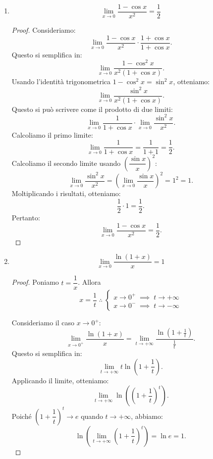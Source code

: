 \documentclass{article}
\theoremstyle{plain}
\theoremstyle{definition}
\theoremstyle{remark}
\begin{document}
\begin{enumerate}
\begin{proof}
\[        \]
        Pertanto:
        \[
        \lim_{t \to +\infty}\left(1 + \dfrac{1}{t}\right)^{(1 + t)} = e \cdot 1 = e.
        \]
    \end{proof}
    \item \[\lim_{x\to0}\dfrac{1-\cos x}{x^2}=\dfrac{1}{2}\]
    \begin{proof}
        Consideriamo:
        \[
        \lim_{x \to 0}\dfrac{1-\cos x}{x^2} \cdot \dfrac{1+\cos x}{1+\cos x}.
        \]
        Questo si semplifica in:
        \[
        \lim_{x \to 0}\dfrac{1-\cos^2 x}{x^2(1+\cos x)}.
        \]
        Usando l'identità trigonometrica \( 1 - \cos^2 x = \sin^2 x \), otteniamo:
        \[
        \lim_{x \to 0}\dfrac{\sin^2 x}{x^2(1+\cos x)}.
        \]
        Questo si può scrivere come il prodotto di due limiti:
        \[
        \lim_{x \to 0}\dfrac{1}{1+\cos x} \cdot \lim_{x \to 0}\dfrac{\sin^2 x}{x^2}.
        \]
        Calcoliamo il primo limite:
        \[
        \lim_{x \to 0}\dfrac{1}{1+\cos x} = \dfrac{1}{1+1} = \dfrac{1}{2}.
        \]
        Calcoliamo il secondo limite usando \( \left(\dfrac{\sin x}{x}\right)^2 \):
        \[
        \lim_{x \to 0}\dfrac{\sin^2 x}{x^2} = \left(\lim_{x \to 0}\dfrac{\sin x}{x}\right)^2 = 1^2 = 1.
        \]
        Moltiplicando i risultati, otteniamo:
        \[
        \dfrac{1}{2} \cdot 1 = \dfrac{1}{2}.
        \]
        Pertanto:
        \[
        \lim_{x\to0}\dfrac{1-\cos x}{x^2} = \dfrac{1}{2}.
        \]
    \end{proof}
    \item \[\lim_{x\to0}\dfrac{\ln(1+x)}{x}=1\]
    \begin{proof}
        Poniamo \( t = \dfrac{1}{x} \). Allora 
        \[x=\dfrac{1}{t}\;\therefore\;\begin{cases}x\to0^+\;\implies\; t\to+\infty\\ x\to0^-\;\implies\; t\to-\infty\end{cases}\]

        Consideriamo il caso \( x \to 0^+ \):
        \[
        \lim_{x\to0^+}\dfrac{\ln(1+x)}{x} = \lim_{t\to+\infty}\dfrac{\ln\left(1+\frac{1}{t}\right)}{\frac{1}{t}}.
        \]
        Questo si semplifica in:
        \[
        \lim_{t\to+\infty} t \ln\left(1+\dfrac{1}{t}\right).
        \]
        Applicando il limite, otteniamo:
        \[
        \lim_{t\to+\infty} \ln\left( \left(1+\dfrac{1}{t}\right)^t \right).
        \]
        Poiché \( \left(1 + \dfrac{1}{t}\right)^t \to e \) quando \( t \to +\infty \), abbiamo:
        \[
        \ln\left(\lim_{t\to+\infty}\left(1+\dfrac{1}{t}\right)^t\right) = \ln e = 1.
        \]
    

\end{proof}
\end{enumerate}
\end{document}
